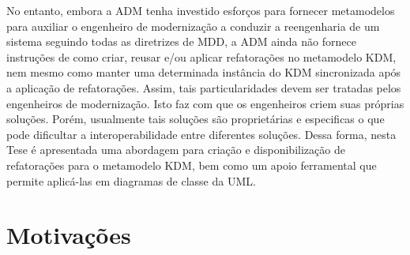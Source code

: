 No entanto, embora a ADM tenha investido esforços para fornecer metamodelos para auxiliar o engenheiro de modernização a conduzir a reengenharia de um sistema seguindo todas as diretrizes de MDD, a ADM ainda não fornece instruções de como criar, reusar e/ou aplicar refatorações no metamodelo KDM, nem mesmo como manter uma determinada instância do KDM sincronizada após a aplicação de refatorações. Assim, tais particularidades devem ser tratadas pelos engenheiros de modernização. Isto faz com que os engenheiros criem suas próprias soluções. Porém, usualmente tais soluções são proprietárias e especificas o que pode dificultar a interoperabilidade entre diferentes soluções. Dessa forma, nesta Tese é apresentada uma abordagem para criação e disponibilização de refatorações para o metamodelo KDM, bem como um apoio ferramental que permite aplicá-las em diagramas de classe da UML. 




\section{Motivações}\label{sec:justificativa_e_motivacao}



